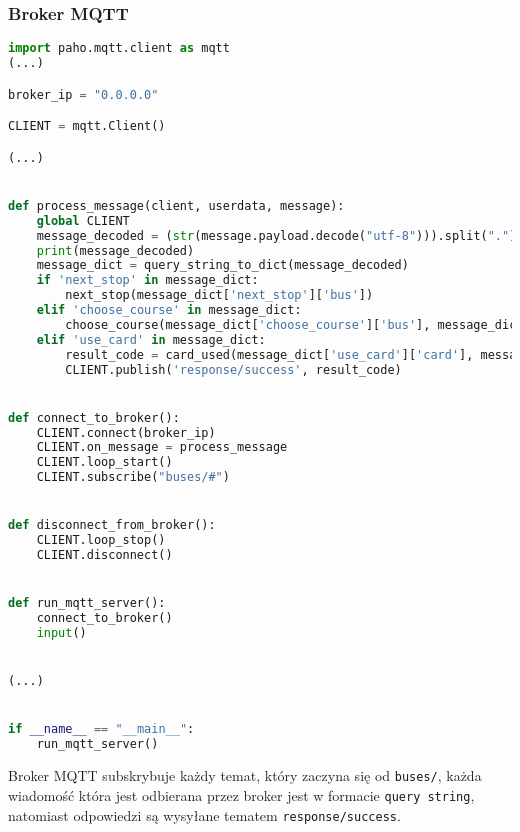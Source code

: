 \subsubsection{Broker MQTT}
\begin{lstlisting}[language={Python}, caption={Broker MQTT, Lokalizacja: \texttt{backend/mqtt\_server.py}}]
import paho.mqtt.client as mqtt
(...)

broker_ip = "0.0.0.0"

CLIENT = mqtt.Client()

(...)


def process_message(client, userdata, message):
    global CLIENT
    message_decoded = (str(message.payload.decode("utf-8"))).split(".")[0]
    print(message_decoded)
    message_dict = query_string_to_dict(message_decoded)
    if 'next_stop' in message_dict:
        next_stop(message_dict['next_stop']['bus'])
    elif 'choose_course' in message_dict:
        choose_course(message_dict['choose_course']['bus'], message_dict['choose_course']['course'])
    elif 'use_card' in message_dict:
        result_code = card_used(message_dict['use_card']['card'], message_dict['use_card']['bus'])
        CLIENT.publish('response/success', result_code)


def connect_to_broker():
    CLIENT.connect(broker_ip)
    CLIENT.on_message = process_message
    CLIENT.loop_start()
    CLIENT.subscribe("buses/#")


def disconnect_from_broker():
    CLIENT.loop_stop()
    CLIENT.disconnect()


def run_mqtt_server():
    connect_to_broker()
    input()


(...)


if __name__ == "__main__":
    run_mqtt_server()
\end{lstlisting}
Broker MQTT subskrybuje każdy temat, który zaczyna się od \verb|buses/|, każda wiadomość która jest odbierana przez broker jest w formacie \verb|query string|, natomiast odpowiedzi są wysyłane tematem \verb|response/success|.
\pagebreak
